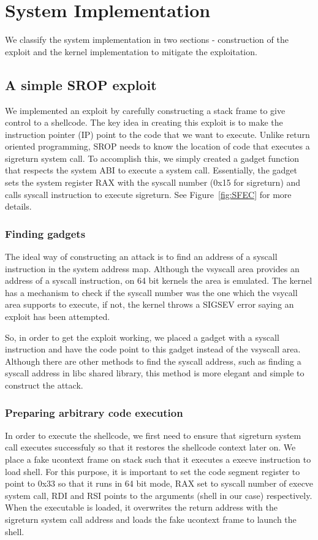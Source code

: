 \documentclass{sig-alternate-05-2015}
\begin{document}
\section {System Implementation}
We classify the system implementation in two sections - construction
of the exploit and the kernel implementation to mitigate the exploitation.

\subsection{A simple SROP exploit}
We implemented an exploit by carefully constructing a stack frame to give
control to a shellcode. The key idea in creating this exploit is to make
the instruction pointer (IP) point to the code that we want to execute. 
Unlike return oriented programming, SROP needs to know the location of 
code that executes a sigreturn system call. To accomplish this, we simply
created a gadget function that respects the system ABI to execute a system
call. Essentially, the gadget sets the system register RAX with the syscall
number (0x15 for sigreturn) and calls syscall instruction to execute sigreturn.
See Figure~\ref{fig:SFEC} for more details.

\subsubsection{Finding gadgets}
\par The ideal way of constructing an attack is to find an address of a
syscall instruction in the system address map. Although the vsyscall area provides 
an address of a syscall instruction, on 64 bit kernels the area is emulated. 
The kernel has a mechanism to check if the syscall number was the one which the 
vsycall area supports to execute, if not, the kernel throws a SIGSEV error 
saying an exploit has been attempted.  
\par So, in order to get the exploit working, we placed a gadget with a syscall 
instruction and have the code point to this gadget instead of the vsyscall area.
Although there are other methods to find the syscall address, such as finding a 
syscall address in libc shared library, this method is more elegant and simple to 
construct the attack.

\subsubsection{Preparing arbitrary code execution}
In order to execute the shellcode, we first need to ensure that sigreturn system
call executes successfuly so that it restores the shellcode context later on. We
place a fake ucontext frame on stack such that it executes a execve instruction to
load shell. For this purpose, it is important to set the code segment register to 
point to 0x33 so that it runs in 64 bit mode, RAX set to syscall number of execve
system call, RDI and RSI points to the arguments (shell in our case) respectively.
When the executable is loaded, it overwrites the return address with the sigreturn
system call address and loads the fake ucontext frame to launch the shell.
\end{document}
